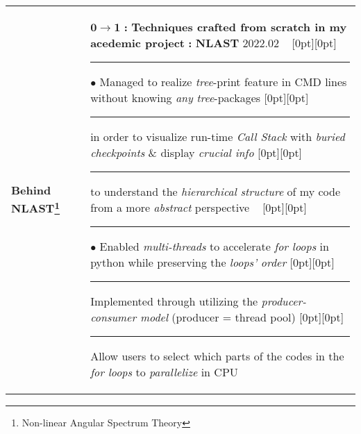 {{\begin{tabularx}{\linewidth}{@{} R{3.1cm} @{\phantom{d}} L{14.97cm} @{}}
	\textbf{Behind NLAST\footnote{Non-linear Angular Spectrum Theory}} & \hspace{10pt} $\boldsymbol{0 \to 1}$ \textbf{:} \textbf{Techniques crafted from scratch in my acedemic project} \textbf{:} \textbf{NLAST} \hfill 2022.02 \textendash \newline \vspace{2pt} \ \hspace{-3pt} \raisebox{0.09\height}[0pt][0pt]{\vrule width0.5pt height30.0pt} \hspace{-0.26em}\rule[0.25em]{1.0em}{0.5pt}\!\! $\bullet$ {\small Managed to realize \textit{tree}-print feature in CMD lines without knowing \textit{any} \textit{tree}-packages} \newline \vspace{-3pt} \hspace{12.5pt} \raisebox{0.18\height}[0pt][0pt]{\vrule width0.5pt height15.0pt} \hspace{-0.26em}\rule[0.25em]{1.0em}{0.5pt}\!\! \raisebox{0.2\height}{\scriptsize $\blacktriangleright$} {\small in order to visualize run-time \textit{Call Stack} with \textit{buried checkpoints} \& display \textit{crucial info}} \newline \vspace{-3pt} \hspace{12.5pt} \raisebox{0.18\height}[0pt][0pt]{\vrule width0.5pt height15.0pt} \hspace{-0.26em}\rule[0.25em]{1.0em}{0.5pt}\!\! \raisebox{0.2\height}{\scriptsize $\blacktriangleright$} {\small to understand the \textit{hierarchical structure} of my code from a more \textit{abstract} perspective} \newline \vspace{-3pt} \ \hspace{-3pt} \raisebox{0.06\height}[0pt][0pt]{\vrule width0.5pt height45.0pt} \hspace{-0.26em}\rule[0.25em]{1.0em}{0.5pt}\!\! $\bullet$ {\small Enabled \textit{multi-threads} to accelerate \textit{for loops} in python while preserving the \textit{loops' order}} \newline \vspace{-3pt} \hspace{12.5pt} \raisebox{0.18\height}[0pt][0pt]{\vrule width0.5pt height15.0pt} \hspace{-0.26em}\rule[0.25em]{1.0em}{0.5pt}\!\! \raisebox{0.2\height}{\scriptsize $\blacktriangleright$} {\small Implemented through utilizing the \textit{producer-consumer model} (producer = thread pool)} \newline \vspace{-3pt} \hspace{12.5pt} \raisebox{0.18\height}[0pt][0pt]{\vrule width0.5pt height15.0pt} \hspace{-0.26em}\rule[0.25em]{1.0em}{0.5pt}\!\! \raisebox{0.2\height}{\scriptsize $\blacktriangleright$} {\small Allow users to select which parts of the codes in the \textit{for loops} to \textit{parallelize} in CPU} \newline 
\end{tabularx}}}
